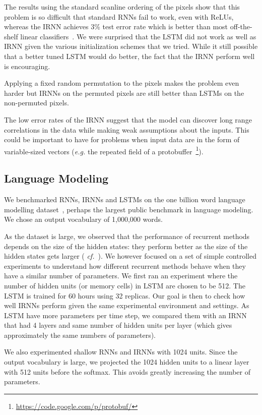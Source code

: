 \documentclass{article} \usepackage{nips14submit_e,times,graphicx}
\begin{document}
The results using the standard scanline ordering of the pixels show
that this problem is so difficult that standard RNNs fail to work,
even with ReLUs, whereas the IRNN achieves 3\% test error rate which
is better than most off-the-shelf linear
classifiers~\cite{lecun98}. We were surprised that the LSTM did not
work as well as IRNN given the various initialization schemes that we
tried. While it still possible that a better tuned LSTM would do
better, the fact that the IRNN perform well is encouraging.

Applying a fixed random permutation to the pixels makes the problem
even harder but IRNNs on the permuted pixels are still better
than LSTMs on the non-permuted pixels.

The low error rates of the IRNN suggest that the model can discover
long range correlations in the data while making weak assumptions
about the inputs. This could be important to have for problems when
input data are in the form of variable-sized vectors ({\it e.g.}  the
repeated field of a
protobuffer~\footnote{\url{https://code.google.com/p/protobuf/}}).


\subsection{Language Modeling}
We benchmarked RNNs, IRNNs and LSTMs on the one billion word language
modelling dataset~\cite{DBLP:journals/corr/ChelbaMSGBK13}, perhaps the
largest public benchmark in language modeling. We chose an output
vocabulary of 1,000,000 words.

As the dataset is large, we observed that the performance of recurrent
methods depends on the size of the hidden states: they perform better
as the size of the hidden states gets larger ({\it
  cf.}~\cite{DBLP:journals/corr/ChelbaMSGBK13}). We however focused on
a set of simple controlled experiments to understand how different
recurrent methods behave when they have a similar number of
parameters. We first ran an experiment where the number of hidden
units (or memory cells) in LSTM are chosen to be 512. The LSTM is
trained for 60 hours using 32 replicas. Our goal is then to check how
well IRNNs perform given the same experimental environment and
settings. As LSTM have more parameters per time step, we compared them
with an IRNN that had 4 layers and same number of hidden units per
layer (which gives approximately the same numbers of parameters).

We also experimented shallow RNNs and IRNNs with 1024 units. Since the
output vocabulary is large, we projected the 1024 hidden units to a
linear layer with 512 units before the softmax.  This avoids greatly
increasing the number of parameters.
\end{document}

